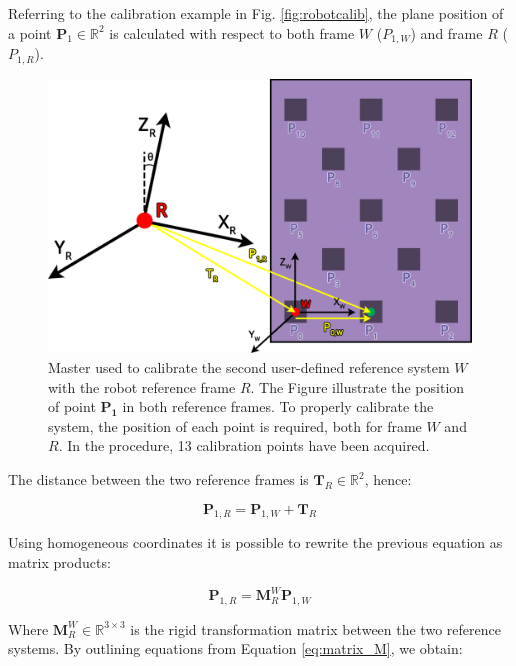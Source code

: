 \documentclass[letterpaper, 10 pt, conference]{ieeeconf}  %
\begin{document}
Referring to the calibration example in Fig. \ref{fig:robotcalib}, the plane position of a point $\mathbf{P}_1\in\mathbb{R}^2$ is calculated with respect to both frame $W$ ($P_{1,W}$) and frame $R$ ($P_{1,R}$).

\begin{figure}[h]
	\centering
	\includegraphics[width=1\columnwidth]{figures/calibration.png}
	\caption{Master used to calibrate the second user-defined reference system $W$ with the robot reference frame $R$. The Figure illustrate the position of  point $\mathbf{P_1}$ in both reference frames. To properly calibrate the system, the position of each point is required, both for frame $W$ and $R$. In the procedure, 13 calibration points have been acquired.}
	\label{fig:master_robot}
\end{figure}

The distance between the two reference frames is $\mathbf{T}_R\in\mathbb{R}^2$, hence:

\begin{equation}
\mathbf{P}_{1,R} = \mathbf{P}_{1,W} + \mathbf{T}_R
\end{equation}

Using homogeneous coordinates it is possible to rewrite the previous equation as matrix products:

\begin{equation}\label{eq:matrix_M}
\mathbf{P}_{1,R} = \mathbf{M}^W_{R}\mathbf{P}_{1,W}
\end{equation}

Where $\mathbf{M}^W_{R}\in\mathbb{R}^{3\times3}$ is the rigid transformation matrix between the two reference systems. By outlining equations from Equation \ref{eq:matrix_M}, we obtain:
\end{document}
